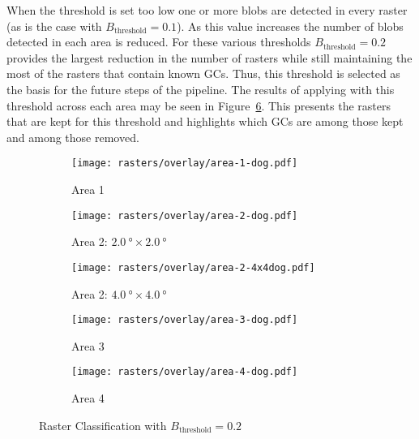 
When the threshold is set too low one or more blobs are detected in every raster (as is the case with $B_{\text{threshold}} = 0.1$). As this value increases the number of blobs detected in each area is reduced. For these various thresholds $B_{\text{threshold}} = 0.2$ provides the largest reduction in the number of rasters while still maintaining the most of the rasters that contain known GCs. Thus, this threshold is selected as the basis for the future steps of the pipeline. The results of applying \blobdog{} with this threshold  across each area may be seen in Figure~\ref{fig:filtered-dog-rasters}. This presents the rasters that are kept for this threshold and highlights which GCs are among those kept and among those removed.

\begin{figure}[H]
    \centering
    \begin{subfigure}[b]{0.75\textwidth}
        \texttt{[image: rasters/overlay/area-1-dog.pdf]}
        \caption{\label{fig:dog-a1-overview}Area 1}
    \end{subfigure}

    \begin{subfigure}[b]{0.49\textwidth}
        \texttt{[image: rasters/overlay/area-2-dog.pdf]}
        \caption{\label{fig:dog-a2-overview}Area 2: $\SI{2.0}{\degree}\times\SI{2.0}{\degree}$}
    \end{subfigure}
    \begin{subfigure}[b]{0.49\textwidth}
        \texttt{[image: rasters/overlay/area-2-4x4dog.pdf]}
        \caption{\label{fig:dog-a2-4x4-overview}Area 2: $\SI{4.0}{\degree}\times\SI{4.0}{\degree}$}
    \end{subfigure}

    \begin{subfigure}[b]{0.49\textwidth}
        \texttt{[image: rasters/overlay/area-3-dog.pdf]}
        \caption{\label{fig:dog-a3-overview}Area 3}
    \end{subfigure}
    \begin{subfigure}[b]{0.49\textwidth}
        \texttt{[image: rasters/overlay/area-4-dog.pdf]}
        \caption{\label{fig:dog-a4-overview}Area 4}
    \end{subfigure}
    \caption{\label{fig:filtered-dog-rasters}\blobdog{} Raster Classification with $B_{\text{threshold}} = 0.2$}
\end{figure}

